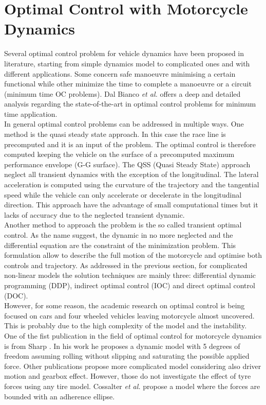 \section{Optimal Control with Motorcycle Dynamics}
\label{chapter1_2}
%
Several optimal control problem for vehicle dynamics have been proposed in literature, starting from simple dynamics model to complicated ones and with different applications. Some concern safe manoeuvre minimising a certain functional while other minimize the time to complete a manoeuvre or a circuit (minimum time OC problems). Dal Bianco \textit{et al.}\cite{dal2019comparison} offers a deep and detailed analysis regarding the state-of-the-art in optimal control problems for minimum time application.\\
In general optimal control problems can be addressed in multiple ways. One method is the quasi steady state approach. In this case the race line is precomputed and it is an input of the problem. The optimal control is therefore computed keeping the vehicle on the surface of a precomputed maximum performance envelope (G-G surface). The QSS (Quasi Steady State) approach neglect all transient dynamics with the exception of the longitudinal. The lateral acceleration is computed using the curvature of the trajectory and the tangential speed while the vehicle can only accelerate or decelerate in the longitudinal direction. This approach have the advantage of small computational times but it lacks of accuracy due to the neglected transient dynamic.\\
Another method to approach the problem is the so called transient optimal control. As the name suggest, the dynamic in no more neglected and the differential equation are the constraint of the minimization problem. This formulation allow to describe the full motion of the motorcycle and optimise both controls and trajectory. As addressed in the previous section, for complicated non-linear models the solution techniques are mainly three: differential dynamic programming (DDP), indirect optimal control (IOC) and direct optimal control (DOC).\\
However, for some reason, the academic research on optimal control is being focused on cars and four wheeled vehicles leaving motorcycle almost uncovered. This is probably due to the high complexity of the model and the instability.\\
One of the fist publication in the field of optimal control for motorcycle dynamics is from Sharp \cite{sharp2014method}. In his work he proposes a dynamic model with 5 degrees of freedom assuming rolling without slipping and saturating the possible applied force. Other publications propose more complicated model considering also driver motion and gearbox effect\cite{cossalter2010investigation,lot2008advanced,simon2008application}. However, those do not investigate the effect of tyre forces using any tire model. Cossalter \textit{et al.}\cite{cossalter2010investigation} propose a model where the forces are bounded with an adherence ellipse.\\
